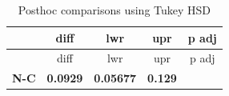 \documentclass[]{article}
\begin{document}
\begin{longtable}[]{@{}ccccc@{}}
\caption{Posthoc comparisons using Tukey HSD}\tabularnewline
\toprule
\begin{minipage}[b]{0.13\columnwidth}\centering\strut
~
\strut\end{minipage} &
\begin{minipage}[b]{0.16\columnwidth}\centering\strut
diff
\strut\end{minipage} &
\begin{minipage}[b]{0.16\columnwidth}\centering\strut
lwr
\strut\end{minipage} &
\begin{minipage}[b]{0.16\columnwidth}\centering\strut
upr
\strut\end{minipage} &
\begin{minipage}[b]{0.16\columnwidth}\centering\strut
p adj
\strut\end{minipage}\tabularnewline
\midrule
\endfirsthead
\toprule
\begin{minipage}[b]{0.13\columnwidth}\centering\strut
~
\strut\end{minipage} &
\begin{minipage}[b]{0.16\columnwidth}\centering\strut
diff
\strut\end{minipage} &
\begin{minipage}[b]{0.16\columnwidth}\centering\strut
lwr
\strut\end{minipage} &
\begin{minipage}[b]{0.16\columnwidth}\centering\strut
upr
\strut\end{minipage} &
\begin{minipage}[b]{0.16\columnwidth}\centering\strut
p adj
\strut\end{minipage}\tabularnewline
\midrule
\endhead
\begin{minipage}[t]{0.13\columnwidth}\centering\strut
\textbf{N-C}
\strut\end{minipage} &
\begin{minipage}[t]{0.16\columnwidth}\centering\strut
\textbf{0.0929}
\strut\end{minipage} &
\begin{minipage}[t]{0.16\columnwidth}\centering\strut
\textbf{0.05677}
\strut\end{minipage} &
\begin{minipage}[t]{0.16\columnwidth}\centering\strut
\textbf{0.129}
\strut\end{minipage} &
\begin{minipage}[t]{0.16\columnwidth}\centering\strut

\end{minipage}
\end{longtable}
\end{document}
